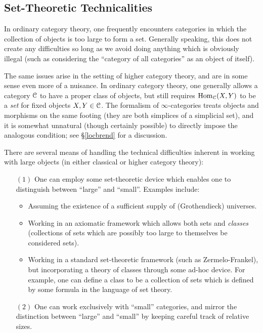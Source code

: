 \subsection{Set-Theoretic Technicalities}
\begin{1.2.15 Set-Theoretic Technicalities}
In ordinary category theory, one frequently encounters categories in which the collection of objects
is too large to form a set. Generally speaking, this does not create
any difficulties so long as we avoid doing anything which is obviously illegal
(such as considering the ``category of all categories'' as an object of itself).

The same issues arise in the setting of higher category theory, and are
in some sense even more of a nuisance. In ordinary category
theory, one generally allows a category $\operatorname{\mathcal{C}}$ to have a proper
class of objects, but still requires $\operatorname{Hom}_{\operatorname{\mathcal{C}}}(X,Y)$ to be a
{\em set} for fixed objects $X,Y \in \operatorname{\mathcal{C}}$. The formalism of $\infty$-categories treats
objects and morphisms on the same footing (they are both simplices of a simplicial set), and it is somewhat unnatural (though certainly possible) to directly impose the analogous condition; see \S \ref{locbrend} for a discussion.

There are several means of handling the technical difficulties
inherent in working with large objects (in either classical or higher category theory):

\begin{itemize}
\item[$(1)$] One can employ some set-theoretic device which enables one
to distinguish between ``large'' and ``small''. Examples include:
\begin{itemize}
\item Assuming the existence of a sufficient supply of
(Grothendieck) universes.

\item Working in an axiomatic framework which allows both sets and
{\it classes} (collections of sets which are possibly too large to
themselves be considered sets).

\item Working in a standard set-theoretic framework (such as
Zermelo-Frankel), but incorporating a theory of classes through
some ad-hoc device. For example, one can define a class to be a
collection of sets which is defined by some formula in the
language of set theory.
\end{itemize}

\item[$(2)$] One can work exclusively with ``small'' categories, and
mirror the distinction between ``large'' and ``small'' by keeping
careful track of relative sizes.


\end{itemize}
\end{1.2.15 Set-Theoretic Technicalities}
